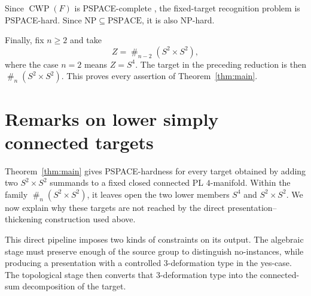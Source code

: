 \documentclass[a4paper,11pt,reqno]{amsart}
\theoremstyle{definition}
\theoremstyle{remark}
\DeclareMathOperator{\CWP}{CWP}
\newcommand{\cs}{\mathbin{\#}}
\begin{document}
	Since $\CWP(F)$ is PSPACE-complete \cite[Corollary~56]{BFLaW}, the
	fixed-target recognition problem is PSPACE-hard. Since
	$\mathrm{NP}\subseteq\mathrm{PSPACE}$, it is also NP-hard.
	
	Finally, fix $n\geq2$ and take
	\[
	Z=\cs_{n-2}(S^2\times S^2),
	\]
	where the case $n=2$ means $Z=S^4$. The target in the preceding
	reduction is then $\cs_n(S^2\times S^2)$. This proves every assertion
	of Theorem~\ref{thm:main}.
	
	\section{Remarks on lower simply connected targets}
	\label{sec:final-remarks}
	
	Theorem~\ref{thm:main} gives PSPACE-hardness for every target obtained by
	adding two $S^2\times S^2$ summands to a fixed closed connected PL
	$4$-manifold. Within the family $\cs_n(S^2\times S^2)$, it leaves open
	the two lower members $S^4$ and $S^2\times S^2$. We now explain why
	these targets are not reached by the direct presentation--thickening
	construction used above.
	
	This direct pipeline imposes two kinds of constraints on its output. The
	algebraic stage must preserve enough of the source group to distinguish
	no-instances, while producing a presentation with a controlled
	$3$-deformation type in the yes-case. The topological stage then converts
	that $3$-deformation type into the connected-sum decomposition of the
	target.
	
\end{document}
